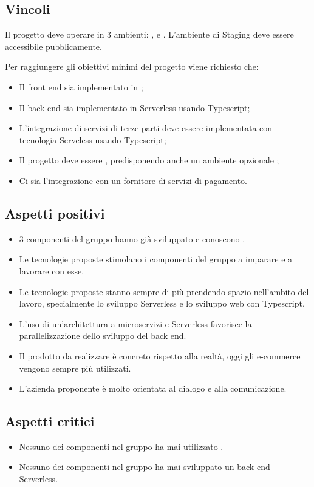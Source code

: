 \subsection{Vincoli}
Il progetto deve operare in 3 ambienti: ,  e . L'ambiente di Staging deve essere accessibile pubblicamente.

Per raggiungere gli obiettivi minimi del progetto viene richiesto che:
\begin{itemize}
	\item Il front end sia implementato in ;
	\item Il back end sia implementato in Serverless usando Typescript;
	\item L'integrazione di servizi di terze parti deve essere implementata con tecnologia Serveless usando Typescript;
	\item Il progetto deve essere , predisponendo anche un ambiente opzionale ;
	\item Ci sia l'integrazione con un fornitore di servizi di pagamento.
\end{itemize}

\subsection{Aspetti positivi}
\begin{itemize}
	\item 3 componenti del gruppo hanno già sviluppato e conoscono .
	\item Le tecnologie proposte stimolano i componenti del gruppo a imparare e a lavorare con esse.
	\item Le tecnologie proposte stanno sempre di più prendendo spazio nell'ambito del lavoro, specialmente lo sviluppo Serverless e lo sviluppo web con Typescript.
	\item L'uso di un'architettura a microservizi e Serverless favorisce la parallelizzazione dello sviluppo del back end.
	\item Il prodotto da realizzare è concreto rispetto alla realtà, oggi gli e-commerce vengono sempre più utilizzati.
	\item L'azienda proponente è molto orientata al dialogo e alla comunicazione.
\end{itemize}

\subsection{Aspetti critici}
\begin{itemize}
	\item Nessuno dei componenti nel gruppo ha mai utilizzato .
	\item Nessuno dei componenti nel gruppo ha mai sviluppato un back end Serverless.
\end{itemize}

